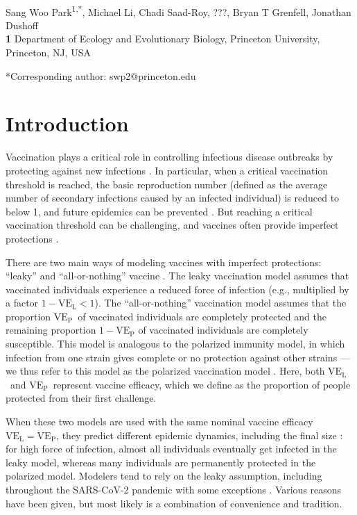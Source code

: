 \documentclass[12pt]{article}
\date{\today}
\newcommand{\VE}{\ensuremath{\mathrm{VE}}}
\newcommand{\VEP}{\ensuremath{\VE_{\mathrm{P}}}}
\newcommand{\VEL}{\ensuremath{\VE_{\mathrm{L}}}}
\begin{document}
\begin{flushleft}{
	\Large
	\textbf{}
}
\newline
\\
Sang Woo Park\textsuperscript{1,*}, Michael Li, Chadi Saad-Roy, ???, Bryan T Grenfell, Jonathan Dushoff
\\
\bigskip
\textbf{1} Department of Ecology and Evolutionary Biology, Princeton University, Princeton, NJ, USA
\\
\bigskip

*Corresponding author: swp2@princeton.edu
\end{flushleft}

\section*{Introduction}

Vaccination plays a critical role in controlling infectious disease outbreaks by protecting against new infections \citep{iwasaki2020and}.
In particular, when a critical vaccination threshold is reached, the basic reproduction number (defined as the average number of secondary infections caused by an infected individual) is reduced to below 1, and future epidemics can be prevented \citep{anderson1985vaccination}.
But reaching a critical vaccination threshold can be challenging, and vaccines often provide imperfect protections \citep{gandon2003imperfect,anderson2020challenges}.

There are two main ways of modeling vaccines with imperfect protections: ``leaky'' and ``all-or-nothing'' vaccine \citep{smith1984assessment}.
The leaky vaccination model assumes that vaccinated individuals experience a reduced force of infection (e.g., multiplied by a factor $1-\VEL < 1$).
The ``all-or-nothing'' vaccination model assumes that the proportion \VEP\ of vaccinated individuals are completely protected and the remaining proportion $1-\VEP$ of vaccinated individuals are completely susceptible.
This model is analogous to the polarized immunity model, in which infection from one strain gives complete or no protection against other strains \citep{gog2002dynamics}---we thus refer to this model as the polarized vaccination model \citep{gomes2014missing}.
Here, both \VEL\ and \VEP\ represent vaccine efficacy, which we define as the proportion of people protected from their first challenge.

When these two models are used with the same nominal vaccine efficacy $\VEL = \VEP$, they predict different epidemic dynamics, including the final size \citep{smith1984assessment}:
for high force of infection, almost all individuals eventually get infected in the leaky model, whereas many individuals are permanently protected in the polarized model.
Modelers tend to rely on the leaky assumption, including throughout the SARS-CoV-2 pandemic \citep{dyson2021possible,gozzi2021importance,marziano2021vaccine,matrajt2021vaccine,park2022intermediate} with some exceptions \citep{bubar2021model,buckner2021dynamic}.
Various reasons have been given, but most likely is a combination of convenience and tradition.
\end{document}
